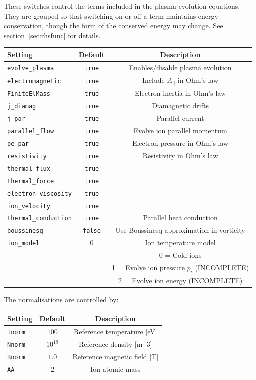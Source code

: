 \documentclass[12pt,a4paper]{article}
\begin{document}
These switches control the terms included in the plasma
evolution equations. They are grouped so that switching on
or off a term maintains energy conservation, though the
form of the conserved energy may change. See section~\ref{sec:rhsfunc} for details.
\begin{center}
\begin{tabular}{l c c}
  Setting & Default & Description \\
  \hline
  \texttt{evolve\_plasma}  & \texttt{true} & Enables/disable plasma evolution \\
  \texttt{electromagnetic}  &  \texttt{true} & Include $A_{||}$ in Ohm's law\\
  \texttt{FiniteElMass}  & \texttt{true} & Electron inertia in Ohm's law \\
  \texttt{j\_diamag} & \texttt{true} & Diamagnetic drifts \\
  \texttt{j\_par} & \texttt{true} & Parallel current \\
  \texttt{parallel\_flow} & \texttt{true} & Evolve ion parallel momentum \\
  \texttt{pe\_par} & \texttt{true} & Electron pressure in Ohm's law \\
  \texttt{resistivity} & \texttt{true} & Resistivity in Ohm's law \\
  \texttt{thermal\_flux} & \texttt{true} &  \\
  \texttt{thermal\_force} & \texttt{true} &  \\
  \texttt{electron\_viscosity} & \texttt{true} &  \\
  \texttt{ion\_velocity} & \texttt{true} &  \\
  \texttt{thermal\_conduction} & \texttt{true} & Parallel heat conduction \\
  \texttt{boussinesq} & \texttt{false} & Use Boussinesq approximation in vorticity \\
  \texttt{ion\_model} & $0$ & Ion temperature model \\
  & & 0 = Cold ions \\
  & & 1 = Evolve ion pressure $p_i$ (INCOMPLETE)\\
  & & 2 = Evolve ion energy (INCOMPLETE) \\
  \hline
\end{tabular}
\end{center}

The normalisations are controlled by:
\begin{center}
\begin{tabular}{l c c}
  Setting & Default & Description \\
  \hline
  \texttt{Tnorm} & $100$ & Reference temperature [eV] \\
  \texttt{Nnorm} & $10^{19}$ & Reference density [m$^-3$] \\
  \texttt{Bnorm} & $1.0$ & Reference magnetic field [T] \\
  \texttt{AA} & $2$ & Ion atomic mass \\
  \hline
\end{tabular}
\end{center}
\end{document}
